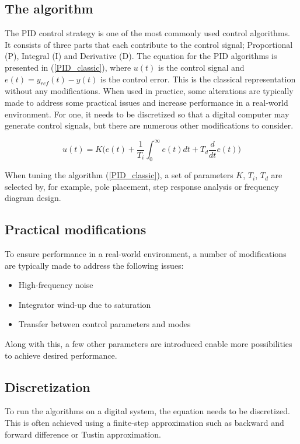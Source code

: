 \documentclass[a4paper]{report}
\begin{document}
		\subsection{The algorithm}
The PID control strategy is one of the most commonly used control algorithms. It consists of three parts that each contribute to the control signal; Proportional (P), Integral (I) and Derivative (D). The equation for the PID algorithms is presented in (\ref{PID_classic}), where $u(t)$ is the control signal and $e(t) = y_{ref}(t) - y(t)$ is the control error. This is the classical representation without any modifications. When used in practice, some alterations are typically made to address some practical issues and increase performance in a real-world environment. For one, it needs to be discretized so that a digital computer may generate control signals, but there are numerous other modifications to consider.

\begin{equation}
u(t) = K \bigg( e(t) + \dfrac{1}{T_i} \int_{0}^{\infty}  e(t) dt + T_d \dfrac{d}{dt} e(t) \bigg)
\label{PID_classic}
\end{equation}

When tuning the algorithm (\ref{PID_classic}), a set of parameters $K$, $T_i$, $T_d$ are selected by, for example, pole placement, step response analysis or frequency diagram design.

	\subsection{Practical modifications}
To ensure performance in a real-world environment, a number of modifications are typically made to address the following issues:

\begin{itemize}
\item High-frequency noise
\item Integrator wind-up due to saturation
\item Transfer between control parameters and modes
\end{itemize}

Along with this, a few other parameters are introduced enable more possibilities to achieve desired performance.

	\subsection{Discretization}
To run the algorithms on a digital system, the equation needs to be discretized. This is often achieved using a finite-step approximation such as backward and forward difference or Tustin approximation.
\end{document}
